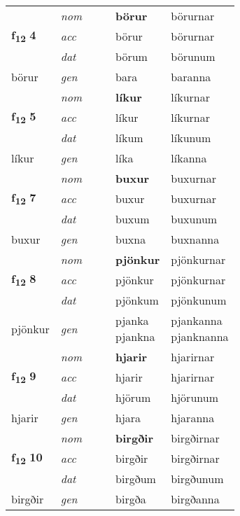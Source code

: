 \begin{longtable}[l]{X>{\footnotesize\itshape}XXXXX}
\multirow{3}{*}{{{\textbf{f{\textsubscript{12}}} \Large{\textbf{4}}}}} & nom &  &  & \textbf{börur} & börurnar \\*
 & acc &  &  & börur & börurnar \\*
 & dat &  &  & börum & börunum \\*
 {\footnotesize{börur}} & gen & \textbf{} &  & bara & baranna \\
\midrule

\multirow{3}{*}{{{\textbf{f{\textsubscript{12}}} \Large{\textbf{5}}}}} & nom &  &  & \textbf{líkur} & líkurnar \\*
 & acc &  &  & líkur & líkurnar \\*
 & dat &  &  & líkum & líkunum \\*
 {\footnotesize{líkur}} & gen & \textbf{} &  & líka & líkanna \\
\midrule

\multirow{3}{*}{{{\textbf{f{\textsubscript{12}}} \Large{\textbf{7}}}}} & nom &  &  & \textbf{buxur} & buxurnar \\*
 & acc &  &  & buxur & buxurnar \\*
 & dat &  &  & buxum & buxunum \\*
 {\footnotesize{buxur}} & gen & \textbf{} &  & buxna & buxnanna \\
\midrule

\multirow{3}{*}{{{\textbf{f{\textsubscript{12}}} \Large{\textbf{8}}}}} & nom &  &  & \textbf{pjönkur} & pjönkurnar \\*
 & acc &  &  & pjönkur & pjönkurnar \\*
 & dat &  &  & pjönkum & pjönkunum \\*
 {\footnotesize{pjönkur}} & gen & \textbf{} &  & \specialcell{pjanka\\ pjankna} & \specialcell{pjankanna\\ pjanknanna} \\
\midrule

\multirow{3}{*}{{{\textbf{f{\textsubscript{12}}} \Large{\textbf{9}}}}} & nom &  &  & \textbf{hjarir} & hjarirnar \\*
 & acc &  &  & hjarir & hjarirnar \\*
 & dat &  &  & hjörum & hjörunum \\*
 {\footnotesize{hjarir}} & gen & \textbf{} &  & hjara & hjaranna \\
\midrule

\multirow{3}{*}{{{\textbf{f{\textsubscript{12}}} \Large{\textbf{10}}}}} & nom &  &  & \textbf{birgðir} & birgðirnar \\*
 & acc &  &  & birgðir & birgðirnar \\*
 & dat &  &  & birgðum & birgðunum \\*
 {\footnotesize{birgðir}} & gen & \textbf{} &  & birgða & birgðanna \\
\midrule


\end{longtable}
